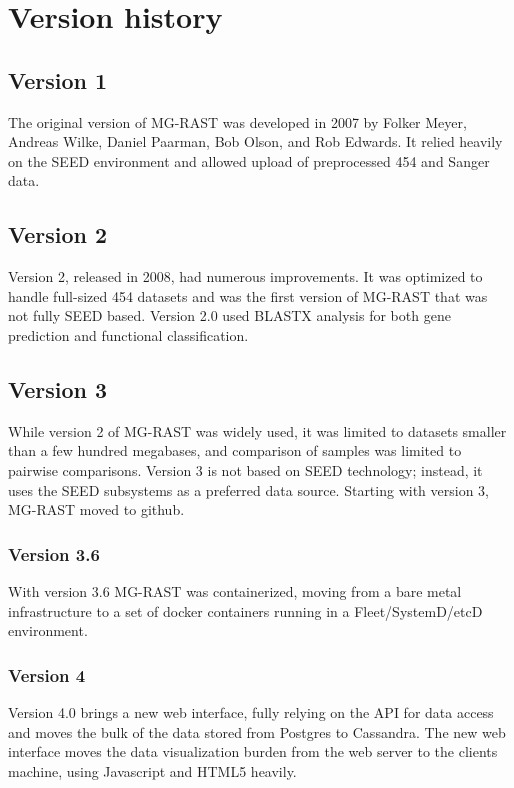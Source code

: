 \documentclass[12pt,fullpage]{report}
\begin{document}
\section{Version history}

\subsection*{Version 1}
The original version of MG-RAST was developed in 2007 by Folker Meyer, Andreas Wilke, Daniel Paarman, Bob Olson, and Rob Edwards. It relied heavily on the \gls{SEED}\cite{SUBSYSTEMS} environment and allowed upload of preprocessed 454 and Sanger data.

\subsection*{Version 2}
Version 2, released in 2008, had numerous improvements. It was optimized to handle full-sized 454 datasets and was the first version of MG-RAST that was not fully \gls{SEED} based.
Version 2.0 used BLASTX analysis for both gene prediction and functional classification\cite{MG-RAST}.

\subsection*{Version 3}
While version 2 of MG-RAST was widely used, it was limited to datasets smaller than a few hundred megabases, and comparison of samples was limited to pairwise comparisons. Version 3 is not based on \gls{SEED} technology; instead, it uses the SEED subsystems as a preferred data source.
Starting with version 3, MG-RAST moved to github.
\subsubsection*{Version 3.6}
With version 3.6 MG-RAST was containerized,  moving from a bare metal infrastructure to a set of docker containers running in a Fleet/SystemD/etcD environment.

\subsubsection*{Version 4}
Version 4.0 brings a new web interface, fully relying on the API for data access and moves the bulk of the data stored from Postgres to Cassandra.
The new web interface moves the data visualization burden from the web server to the clients machine, using Javascript and HTML5 heavily.
\end{document}
